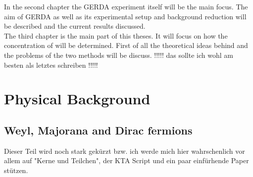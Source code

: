 In the second chapter the GERDA experiment itself will be the main focus. 
The aim of GERDA as well as its experimental setup and background reduction will be described and the current results discussed.\\

The third chapter is the main part of this theses. 
It will focus on how the concentration of \Kr will be determined. 
First of all the theoretical ideas behind and the problems of the two methods will be discuss. !!!!! das sollte ich wohl am besten als letztes schreiben !!!!!


\chapter{Physical Background}
\label{sec:PhyBG}

\section{Weyl, Majorana and Dirac fermions}
\label{sec:WMDf}


Dieser Teil wird noch stark gekürzt bzw. ich werde mich hier wahrschenlich vor allem auf "Kerne und Teilchen", der KTA Script und ein paar einfürhende Paper stützen.


